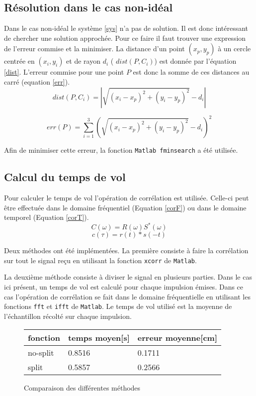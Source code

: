 \documentclass[10pt,a4paper]{article}
\begin{document}
		\subsection{Résolution dans le cas non-idéal}
			Dans le cas non-idéal le système \ref{sys} n'a pas de solution. Il est donc intéressant de chercher une solution approchée. Pour ce faire il faut trouver une expression de l'erreur commise et la minimiser. La distance d'un point $(x_p , y_p)$ à un cercle centrée en $(x_i , y_i)$ et de rayon $d_i$ ( $dist(P , C_i)$) est donnée par l'équation \ref{dist}. L'erreur commise pour une point $P$ est donc la somme de ces distances au carré (equation \ref{err}). 
			\begin{equation}
				dist(P , C_i)= |{\sqrt{(x_i-x_p)^2 +(y_i - y_p)^2} - d_i}| 
				\label{dist}
			\end{equation} 
			
			\begin{equation}
				\label{err}
				err(P) = \sum _{i=1} ^{3} (\sqrt{(x_i-x_p)^2 +(y_i - y_p)^2} - d_i)^2
			\end{equation}
			
			Afin de minimiser cette erreur, la fonction \texttt{Matlab fminsearch} a été utilisée. 
		\subsection{Calcul du temps de vol}
			
			Pour calculer le temps de vol l'opération de corrélation est utilisée. Celle-ci peut être effectuée dans le domaine fréquentiel (Equation \ref{corF}) ou dans le domaine temporel (Equation \ref{corT}). 
			\begin{equation}
				\label{corF}
				C(\omega) = R(\omega)S^*(\omega)
			\end{equation}
			\begin{equation}
				\label{corT}
				c(\tau) = r(t)*s(-t)
			\end{equation}
			
			Deux méthodes ont été implémentées. La première consiste à faire la corrélation sur tout le signal reçu en utilisant la fonction \texttt{xcorr} de \texttt{Matlab}.
			
			 
			La deuxième méthode consiste à diviser le signal en plusieurs parties. Dans le cas ici présent, un temps de vol est calculé pour chaque impulsion émises. Dans ce cas l'opération de corrélation se fait dans le domaine fréquentielle en utilisant les fonctions \texttt{fft} et \texttt{ifft} de \texttt{Matlab}. Le temps de vol utilisé est la moyenne de l'échantillon récolté sur chaque impulsion.
			
			\begin{figure}
				\centering
				\begin{tabular}{|l|l|l|}
					\hline
					fonction & temps moyen[s] & erreur moyenne[cm] \\
					\hline
					no-split & 0.8516 & 0.1711 \\
					split & 0.5857 & 0.2566 \\
					\hline
				\end{tabular}
				\caption{Comparaison des différentes méthodes}
			\end{figure}
			
						
\end{document}
